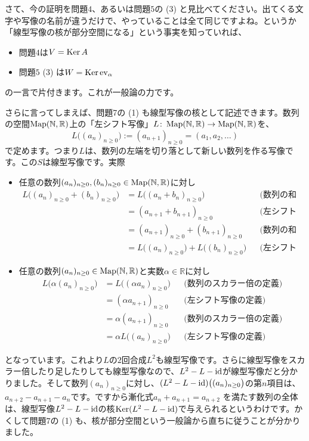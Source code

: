 さて、今の証明を問題$4$、あるいは問題$5$の (3) と見比べてください。出てくる文字や写像の名前が違うだけで、やっていることは全て同じですよね。というか「線型写像の核が部分空間になる」という事実を知っていれば、
\begin{itemize}
\item 問題$4$は$V = \operatorname{Ker} A$
\item 問題$5$ (3) は$W = \operatorname{Ker} \operatorname{ev}_{\alpha}$
\end{itemize}
の一言で片付きます。これが一般論の力です。

さらに言ってしまえば、問題7の (1) も線型写像の核として記述できます。数列の空間$\operatorname{Map}(\mathbb{N}, \mathbb{R})$上の「左シフト写像」$L\colon \operatorname{Map}(\mathbb{N}, \mathbb{R})\rightarrow \operatorname{Map}(\mathbb{N}, \mathbb{R})$を、
\[
L\bigl((a_n)_{n\geq 0}\bigr) := (a_{n+1})_{n \geq 0} = (a_1, a_2, \ldots)
\]
で定めます。つまり$L$は、数列の左端を切り落として新しい数列を作る写像です。この$S$は線型写像です。実際
\begin{itemize}
\item 任意の数列$(a_n)_{n \geq 0}, (b_n)_{n \geq 0}\in\operatorname{Map}(\mathbb{N}, \mathbb{R})$に対し
\begin{align*}
L\bigl((a_n)_{n \geq 0} + (b_n)_{n \geq 0}\bigr)
&= L\bigl((a_n + b_n)_{n \geq 0}\bigr) & & \text{(数列の和の定義)} \\
&= (a_{n + 1} + b_{n + 1})_{n \geq 0} & & \text{(左シフト写像の定義)} \\
&= (a_{n + 1})_{n \geq 0} + (b_{n + 1})_{n \geq 0} & & \text{(数列の和の定義)} \\
&= L\bigl((a_n)_{n \geq 0}\bigr) + L\bigl((b_n)_{n \geq 0}\bigr) & & \text{(左シフト写像の定義)} 
\end{align*}
\item 任意の数列$(a_n)_{n \geq 0}\in\operatorname{Map}(\mathbb{N}, \mathbb{R})$と実数$\alpha\in\mathbb{R}$に対し
\begin{align*}
L\bigl(\alpha (a_n)_{n \geq 0}\bigr) 
&= L\bigl((\alpha a_n)_{n \geq 0}\bigr) & & \text{(数列のスカラー倍の定義)} \\
&= (\alpha a_{n+1})_{n \geq 0} & & \text{(左シフト写像の定義)} \\
&= \alpha (a_{n+1})_{n \geq 0} & & \text{(数列のスカラー倍の定義)} \\
&= \alpha L\bigl((a_n)_{n \geq 0}\bigr) & & \text{(左シフト写像の定義)}
\end{align*}
\end{itemize}
となっています。これより$L$の$2$回合成$L^2$も線型写像です。さらに線型写像をスカラー倍したり足したりしても線型写像なので、$L^2 - L - \operatorname{id}$が線型写像だと分かりました。そして数列$(a_n)_{n\geq 0}$に対し、$(L^2 - L -\operatorname{id})\bigl((a_n)_{n\geq 0}\bigr)$の第$n$項目は、$a_{n+2} - a_{n+1} - a_n$です。ですから漸化式$a_n + a_{n+1} = a_{n+2}$ を満たす数列の全体は、線型写像$L^2 - L - \operatorname{id}$の核$\operatorname{Ker} (L^2 - L - \operatorname{id})$で与えられるというわけです。かくして問題$7$の (1) も、核が部分空間という一般論から直ちに従うことが分かりました。

